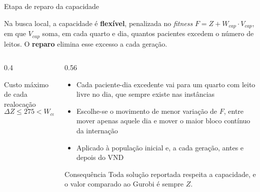 \documentclass[aspectratio=169,10pt]{beamer}
\newcommand{\framerefs}{}
\newcommand{\slidecites}[1]{\gdef\framerefs{Referências: \cite{#1}}}
\gdef\framerefs{}%
\newcommand{\cells}[3]{%
    \foreach \cellcol/\celllab [count=\cellidx from 0] in {#3}{%
        \node[draw=black!60, fill=\cellcol, minimum width=4.6mm, minimum height=4mm,
              inner sep=0pt, font=\tiny] at ({#1+\cellidx*0.46},{#2}) {\celllab};%
    }%
}
\begin{document}
\begin{frame}{Etapa de reparo da capacidade}
    \slidecites{talbi2009metaheuristics}
    {\small Na busca local, a capacidade é \textbf{flexível}, penalizada no \textit{fitness} $F = Z + W_{cap} \cdot V_{cap}$, em que $V_{cap}$ soma, em cada quarto e dia, quantos pacientes excedem o número de leitos. O \textbf{reparo} elimina esse excesso a cada geração.\par}

    \vspace{0.2cm}
    \begin{columns}[c]
        \begin{column}{0.4\textwidth}
            \centering

            \vspace{0.3cm}
            \footnotesize
            Custo máximo de cada realocação
            \[
                \Delta Z \leq 275 < W_{cap} = 1900
            \]
        \end{column}
        \begin{column}{0.56\textwidth}
            \begin{itemize}\setlength{\itemsep}{6pt}
                \item Cada paciente-dia excedente vai para um quarto com leito livre no dia, que sempre existe nas instâncias
                \item Escolhe-se o movimento de menor variação de $F$, entre mover apenas aquele dia e mover o maior bloco contínuo da internação
                \item Aplicado à população inicial e, a cada geração, antes e depois do VND
            \end{itemize}
            \begin{block}{Consequência}
                Toda solução reportada respeita a capacidade, e o valor comparado ao Gurobi é sempre $Z$.
            \end{block}
        \end{column}
    \end{columns}
\end{frame}
\end{document}
